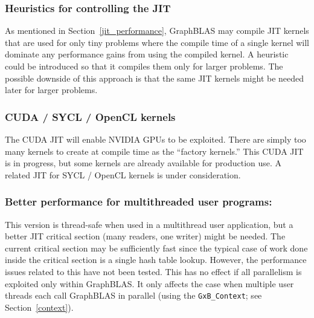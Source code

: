 \subsubsection{Heuristics for controlling the JIT}
As mentioned in Section~\ref{jit_performance}, GraphBLAS may compile JIT
kernels that are used for only tiny problems where the compile time of a single
kernel will dominate any performance gains from using the compiled kernel.  A
heuristic could be introduced so that it compiles them only for larger
problems.  The possible downside of this approach is that the same JIT kernels
might be needed later for larger problems.

\subsubsection{CUDA / SYCL / OpenCL kernels}
The CUDA JIT will enable NVIDIA GPUs to be exploited.  There are simply too
many kernels to create at compile time as the ``factory kernels.''  This CUDA
JIT is in progress, but some kernels are already available for production use.
A related JIT for SYCL / OpenCL kernels is under consideration.

\subsubsection{Better performance for multithreaded user programs:}
This version is thread-safe when used in a multithread user application, but a
better JIT critical section (many readers, one writer) might be needed.  The
current critical section may be sufficiently fast since the typical case of
work done inside the critical section is a single hash table lookup.  However,
the performance issues related to this have not been tested.  This has no
effect if all parallelism is exploited only within GraphBLAS.  It only
affects the case when multiple user threads each call GraphBLAS in parallel
(using the \verb'GxB_Context'; see Section~\ref{context}).

